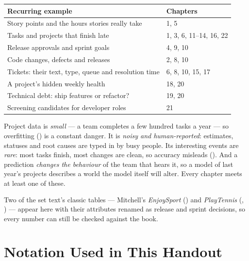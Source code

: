 \begin{longtable}{@{}L{8.4cm}L{6.6cm}@{}}
\toprule
{}
\textbf{Recurring example} & \textbf{Chapters} \\
\midrule
\endhead
Story points and the hours stories really take & 1, 5 \\
Tasks and projects that finish late & 1, 3, 6, 11--14, 16, 22 \\
Release approvals and sprint goals & 4, 9, 10 \\
Code changes, defects and releases & 2, 8, 10 \\
Tickets: their text, type, queue and resolution time & 6, 8, 10, 15, 17 \\
A project's hidden weekly health & 18, 20 \\
Technical debt: ship features or refactor? & 19, 20 \\
Screening candidates for developer roles & 21 \\
\bottomrule
\end{longtable}

\begin{conceptbox}
Project data is \emph{small} --- a team completes a few hundred tasks a year --- so
overfitting () is a constant danger. It is \emph{noisy and
human-reported}: estimates, statuses and root causes are typed in by busy people.
Its interesting events are \emph{rare}: most tasks finish, most changes are clean,
so accuracy misleads (). And a prediction \emph{changes the
behaviour} of the team that hears it, so a model of last year's projects describes
a world the model itself will alter. Every chapter meets at least one of these.
\end{conceptbox}

\noindent Two of the set text's classic tables --- Mitchell's \emph{EnjoySport}
() and \emph{PlayTennis} (, ) --- appear here
with their attributes renamed as release and sprint decisions, so every number can
still be checked against the book.

\section*{Notation Used in This Handout}

